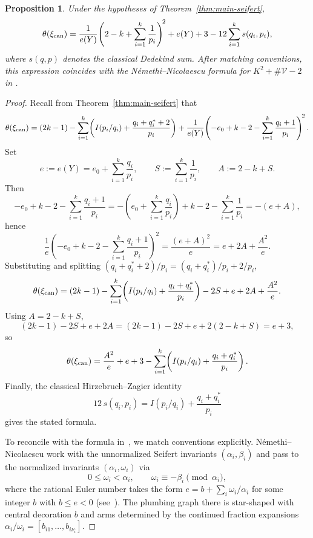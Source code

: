 \documentclass[11pt]{amsart}
\theoremstyle{plain}
\newtheorem{proposition}[theorem]{Proposition}
\theoremstyle{definition}
\theoremstyle{remark}
\begin{document}
\begin{proposition}\label{prop:nemethi-agreement}
Under the hypotheses of Theorem~\ref{thm:main-seifert},
\[
\theta(\xi_{\rm can})
=
\frac{1}{e(Y)}\!\left(2-k+\sum_{i=1}^k\frac{1}{p_i}\right)^{\!2}
+e(Y)+3-12\sum_{i=1}^k s(q_i,p_i),
\]
where $s(q,p)$ denotes the classical Dedekind sum. After matching
conventions, this expression coincides with the
N\'{e}methi--Nicolaescu formula for $K^2+\#\mathcal{V}-2$ in
\cite[\S5]{NemethiNicolaescu2002}.
\end{proposition}

\begin{proof}
Recall from Theorem~\ref{thm:main-seifert} that
\[
\theta(\xi_{\rm can})
=
(2k-1)
-\sum_{i=1}^k\!\left(I(p_i/q_i)+\frac{q_i+q_i^*+2}{p_i}\right)
+\frac{1}{e(Y)}\!\left(-e_0+k-2-\sum_{i=1}^k\frac{q_i+1}{p_i}\right)^{\!2}.
\]
Set
\[
e:=e(Y)=e_0+\sum_{i=1}^k\frac{q_i}{p_i},
\qquad
S:=\sum_{i=1}^k\frac{1}{p_i},
\qquad
A:=2-k+S.
\]
Then
\[
-e_0+k-2-\sum_{i=1}^k\frac{q_i+1}{p_i}
=
-\!\left(e_0+\sum_{i=1}^k\frac{q_i}{p_i}\right)+k-2-\sum_{i=1}^k\frac{1}{p_i}
=
-(e+A),
\]
hence
\[
\frac{1}{e}\!\left(-e_0+k-2-\sum_{i=1}^k\frac{q_i+1}{p_i}\right)^{\!2}
=
\frac{(e+A)^2}{e}
=
e+2A+\frac{A^2}{e}.
\]
Substituting and splitting
$(q_i+q_i^*+2)/p_i=(q_i+q_i^*)/p_i+2/p_i$,
\[
\theta(\xi_{\rm can})
=
(2k-1)
-\sum_{i=1}^k\!\left(I(p_i/q_i)+\frac{q_i+q_i^*}{p_i}\right)
-2S+e+2A+\frac{A^2}{e}.
\]
Using $A=2-k+S$,
\[
(2k-1)-2S+e+2A
=
(2k-1)-2S+e+2(2-k+S)
=
e+3,
\]
so
\[
\theta(\xi_{\rm can})
=
\frac{A^2}{e}+e+3
-\sum_{i=1}^k\!\left(I(p_i/q_i)+\frac{q_i+q_i^*}{p_i}\right).
\]
Finally, the classical Hirzebruch--Zagier identity
\[
12\,s(q_i,p_i)
=
I(p_i/q_i)+\frac{q_i+q_i^*}{p_i}
\]
gives the stated formula.

To reconcile with the formula
in~\cite[\S5]{NemethiNicolaescu2002}, we match conventions explicitly.
N\'{e}methi--Nicolaescu work with the unnormalized Seifert invariants
$(\alpha_i,\beta_i)$ and pass to the normalized invariants
$(\alpha_i,\omega_i)$ via
\[
0\le\omega_i<\alpha_i,\qquad
\omega_i\equiv -\beta_i\pmod{\alpha_i},
\]
where the rational Euler number takes the form
$e=b+\sum_i\omega_i/\alpha_i$ for some integer $b$ with $b\le e<0$
(see~\cite[\S2.15]{NemethiNicolaescu2002}). The plumbing graph there
is star-shaped with central decoration $b$ and arms determined by the
continued fraction expansions
$\alpha_i/\omega_i=[b_{i1},\dots,b_{i\nu_i}]$.


\end{proof}
\end{document}
